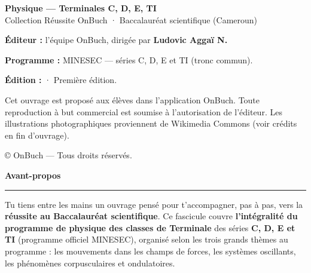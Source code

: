 





\frontmatter

\thispagestyle{empty}
\null\vfill
\noindent{\color{onbo}\rule{3cm}{2pt}}\par\vspace{8pt}
{\sffamily\bfseries\color{onbink} Physique — Terminales C, D, E, TI}\\[2pt]
{\sffamily\color{onbmuted} Collection Réussite OnBuch · Baccalauréat scientifique (Cameroun)}\par\vspace{12pt}
\noindent\small
\textbf{Éditeur :} l'équipe OnBuch, dirigée par \textbf{Ludovic Aggaï N.}\par\smallskip
\textbf{Programme :} MINESEC — séries C, D, E et TI (tronc commun).\par\smallskip
\textbf{Édition :} \the\year{} · Première édition.\par\vspace{10pt}
{\footnotesize\color{onbmuted} Cet ouvrage est proposé aux élèves dans l'application OnBuch.
Toute reproduction à but commercial est soumise à l'autorisation de l'éditeur.
Les illustrations photographiques proviennent de Wikimedia Commons (voir crédits en fin d'ouvrage).}
\par\vspace{6pt}
{\footnotesize\color{onbmuted}\copyright{} \the\year{} OnBuch — Tous droits réservés.}
\vfill
\clearpage

\thispagestyle{empty}
\vspace*{0.6cm}
{\sffamily\fontsize{30}{32}\selectfont\bfseries\color{onbink} Avant-propos}\par\vspace{4pt}
{\color{onbo}\rule{5cm}{2.5pt}}\par\vspace{16pt}

\noindent Tu tiens entre les mains un ouvrage pensé pour t'accompagner, pas à pas,
vers la \textbf{réussite au Baccalauréat scientifique}. Ce fascicule couvre
\textbf{l'intégralité du programme de physique des classes de Terminale} des séries
\textbf{C, D, E et TI} (programme officiel MINESEC), organisé selon les trois grands
thèmes au programme : les mouvements dans les champs de forces, les systèmes
oscillants, les phénomènes corpusculaires et ondulatoires.

